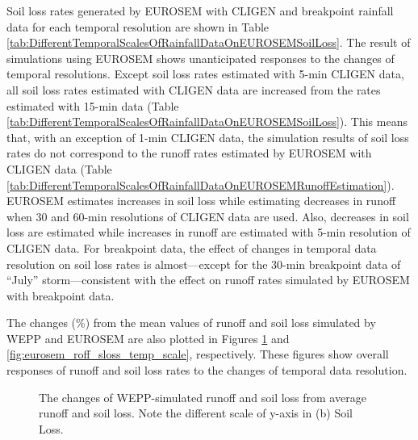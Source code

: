Soil loss rates generated by EUROSEM with CLIGEN and breakpoint rainfall data
for each temporal resolution are shown in Table
\ref{tab:DifferentTemporalScalesOfRainfallDataOnEUROSEMSoilLoss}. The result of
simulations using EUROSEM shows unanticipated responses to the changes of
temporal resolutions. Except soil loss rates estimated with 5-min CLIGEN data,
all
soil loss rates estimated with CLIGEN data are increased from the rates
estimated with 15-min data
(Table \ref{tab:DifferentTemporalScalesOfRainfallDataOnEUROSEMSoilLoss}). This
means that, with an exception of 1-min CLIGEN data, the simulation results of
soil loss rates do not correspond to the runoff rates estimated by EUROSEM with
CLIGEN data (Table
\ref{tab:DifferentTemporalScalesOfRainfallDataOnEUROSEMRunoffEstimation}).
EUROSEM estimates increases in soil loss while estimating decreases in runoff
when 30 and 60-min resolutions of CLIGEN data are used. Also, decreases in soil
loss
are estimated while increases in runoff are estimated with 5-min resolution of
CLIGEN
data. For breakpoint data, the effect of changes in temporal data resolution on
soil
loss rates is almost---except for the 30-min breakpoint data of ``July''
storm---consistent with the effect on runoff rates simulated by EUROSEM with
breakpoint data.

The changes (\%) from the mean values of runoff and soil loss simulated by WEPP
and EUROSEM are also plotted in Figures \ref{fig:wepp_roff_sloss_temp_scale} and
\ref{fig:eurosem_roff_sloss_temp_scale}, respectively. These figures show
overall responses of runoff and soil loss rates to the changes of temporal data
resolution.

\begin{figure}[p]
  \centering
  \caption[WEPP runoff and soil loss changes]{The changes of WEPP-simulated
runoff and soil loss from average runoff and soil loss. Note the different scale
of y-axis in (b) Soil Loss.}
  \label{fig:wepp_roff_sloss_temp_scale}
\end{figure}

